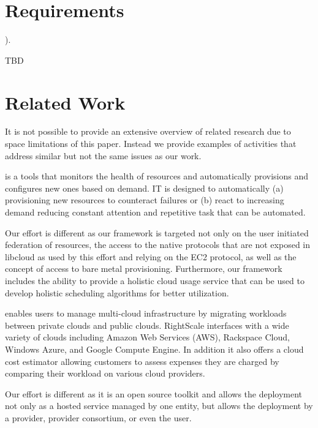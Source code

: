 \documentclass{tex/sig-alternate-2013}
\newcommand{\todo}[1]{{\color{red}{#1}}}
\begin{document}
\section{Requirements} \label{S:requirements}).


TBD


\section{Related Work}\label{S:related}

\todo{READ}

It is not possible to provide an extensive overview of related research due to space limitations of this paper. Instead we provide examples of activities that address similar but not the same issues as our work.

\begin{description}[leftmargin=0pt,itemsep=0pt,topsep=0pt]

\item[Phantom] \cite{phantom12,www-phantom} is a tools that monitors the health of resources and automatically provisions and configures new ones based on demand. IT is designed to automatically (a) provisioning new resources to counteract failures or (b) react to increasing demand reducing constant attention and repetitive task that can be automated.  

  Our effort is different as our framework is targeted not only on the user initiated federation of resources, the access to the native protocols that are not exposed in libcloud as used by this effort and relying on the EC2 protocol, as well as the concept of access to bare metal provisioning. Furthermore, our framework includes the ability to provide a holistic cloud usage service that can be used to develop holistic scheduling algorithms for better utilization.

\item[RightScale] \cite{Rightscale} enables users to manage multi-cloud infrastructure by migrating workloads between private clouds and public clouds. RightScale interfaces with a wide variety of clouds including Amazon Web Services (AWS), Rackspace Cloud, Windows Azure, and Google Compute Engine. In addition it also offers a cloud cost estimator allowing customers to assess expenses they are charged by comparing their workload on various cloud providers.

Our effort is different as it is an open source toolkit and allows the deployment not only as a hosted service managed by one entity, but allows the deployment by a provider, provider consortium, or even the user. 


\end{description}
\end{document}
